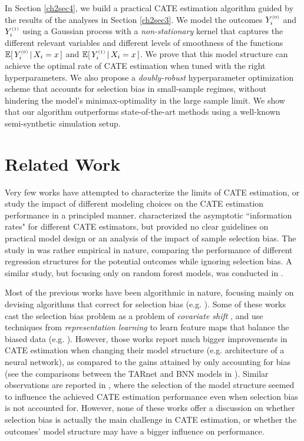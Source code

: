 \documentclass [PhD] {uclathes}
\begin{document}
In Section \ref{ch2sec4}, we build a practical CATE estimation algorithm guided by the results of the analyses in Section \ref{ch2sec3}. We model the outcomes $Y^{\mbox{\tiny $(0)$}}_i$ and $Y^{\mbox{\tiny $(1)$}}_i$ using a Gaussian process with a \textit{non-stationary} kernel that captures the different relevant variables and different levels of smoothness of the functions $\mathbb{E}[\, Y^{\mbox{\tiny $(0)$}}_i\,|\,X_i = x\,]$ and $\mathbb{E}[\, Y^{\mbox{\tiny $(1)$}}_i\,|\,X_i = x\,]$. We prove that this model structure can achieve the optimal rate of CATE estimation when tuned with the right hyperparameters. We also propose a \textit{doubly-robust} hyperparameter optimization scheme that accounts for selection bias in small-sample regimes, without hindering the model's minimax-optimality in the large sample limit. We show that our algorithm outperforms state-of-the-art methods using a well-known semi-synthetic simulation setup.

\section{Related Work}
Very few works have attempted to characterize the limits of CATE estimation, or study the impact of different modeling choices on the CATE estimation performance in a principled manner. \cite{alaa2017bayesian2} characterized the asymptotic ``information rates" for different CATE estimators, but provided no clear guidelines on practical model design or an analysis of the impact of sample selection bias. The study in \cite{kunzel2017meta} was rather empirical in nature, comparing the performance of different regression structures for the potential outcomes while ignoring selection bias. A similar study, but focusing only on random forest models, was conducted in \cite{lu2017estimating}.   

Most of the previous works have been algorithmic in nature, focusing mainly on devising algorithms that correct for selection bias (e.g. \cite{johansson2016learning,jjschaar,wager2017estimation,li2017matching}). Some of these works cast the selection bias problem as a problem of \textit{covariate shift} \cite{sugiyama2007covariate}, and use techniques from \textit{representation learning} to learn feature maps that balance the biased data (e.g. \cite{li2017matching,shalit2016estimating,johansson2016learning}). However, those works report much bigger improvements in CATE estimation when changing their model structure (e.g. architecture of a neural network), as compared to the gains attained by only accounting for bias (see the comparisons between the TARnet and BNN models in \cite{shalit2016estimating}). Similar observations are reported in \cite{alaa2017bayesian,Onur1}, where the selection of the model structure seemed to influence the achieved CATE estimation performance even when selection bias is not accounted for. However, none of these works offer a discussion on whether selection bias is actually the main challenge in CATE estimation, or whether the outcomes' model structure may have a bigger influence on performance.
\end{document}
